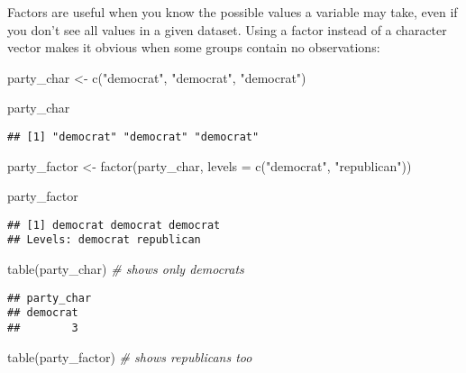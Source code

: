\documentclass[
]{book}
\newenvironment{Shaded}{\begin{snugshade}}{\end{snugshade}}
\newcommand{\AttributeTok}[1]{\textcolor[rgb]{0.77,0.63,0.00}{#1}}
\newcommand{\CommentTok}[1]{\textcolor[rgb]{0.56,0.35,0.01}{\textit{#1}}}
\newcommand{\FunctionTok}[1]{\textcolor[rgb]{0.00,0.00,0.00}{#1}}
\newcommand{\NormalTok}[1]{#1}
\newcommand{\OtherTok}[1]{\textcolor[rgb]{0.56,0.35,0.01}{#1}}
\newcommand{\StringTok}[1]{\textcolor[rgb]{0.31,0.60,0.02}{#1}}
\begin{document}
Factors are useful when you know the possible values a variable may take, even if you don't see all values in a given dataset. Using a factor instead of a character vector makes it obvious when some groups contain no observations:

\begin{Shaded}
\begin{Highlighting}[]
\NormalTok{party\_char }\OtherTok{\textless{}{-}} \FunctionTok{c}\NormalTok{(}\StringTok{"democrat"}\NormalTok{, }\StringTok{"democrat"}\NormalTok{, }\StringTok{"democrat"}\NormalTok{)}

\NormalTok{party\_char}
\end{Highlighting}
\end{Shaded}

\begin{verbatim}
## [1] "democrat" "democrat" "democrat"
\end{verbatim}

\begin{Shaded}
\begin{Highlighting}[]
\NormalTok{party\_factor }\OtherTok{\textless{}{-}} \FunctionTok{factor}\NormalTok{(party\_char, }\AttributeTok{levels =} \FunctionTok{c}\NormalTok{(}\StringTok{"democrat"}\NormalTok{, }\StringTok{"republican"}\NormalTok{))}

\NormalTok{party\_factor}
\end{Highlighting}
\end{Shaded}

\begin{verbatim}
## [1] democrat democrat democrat
## Levels: democrat republican
\end{verbatim}

\begin{Shaded}
\begin{Highlighting}[]
\FunctionTok{table}\NormalTok{(party\_char) }\CommentTok{\# shows only democrats}
\end{Highlighting}
\end{Shaded}

\begin{verbatim}
## party_char
## democrat 
##        3
\end{verbatim}

\begin{Shaded}
\begin{Highlighting}[]
\FunctionTok{table}\NormalTok{(party\_factor) }\CommentTok{\# shows republicans too}
\end{Highlighting}
\end{Shaded}
\end{document}
